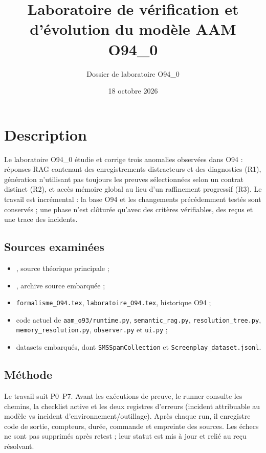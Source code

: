 \documentclass[11pt,a4paper]{article}
\title{Laboratoire de vérification et d'évolution du modèle AAM O94\_0}
\author{Dossier de laboratoire O94\_0}
\date{18 octobre 2026}
\begin{document}
\maketitle
\tableofcontents
\newpage

\section{Description}
Le laboratoire O94\_0 étudie et corrige trois anomalies observées dans O94 : réponses RAG contenant des enregistrements distracteurs et des diagnostics (R1), génération n'utilisant pas toujours les preuves sélectionnées selon un contrat distinct (R2), et accès mémoire global au lieu d'un raffinement progressif (R3). Le travail est incrémental : la base O94 et les changements précédemment testés sont conservés ; une phase n'est clôturée qu'avec des critères vérifiables, des reçus et une trace des incidents.

\subsection{Sources examinées}
\begin{itemize}
\item {}, source théorique principale ;
\item {}, archive source embarquée ;
\item \texttt{formalisme\_O94.tex}, \texttt{laboratoire\_O94.tex}, historique O94 ;
\item code actuel de \texttt{aam\_o93/runtime.py}, \texttt{semantic\_rag.py}, \texttt{resolution\_tree.py}, \texttt{memory\_resolution.py}, \texttt{observer.py} et \texttt{ui.py} ;
\item datasets embarqués, dont \texttt{SMSSpamCollection} et \texttt{Screenplay\_dataset.jsonl}.
\end{itemize}

\subsection{Méthode}
Le travail suit P0–P7. Avant les exécutions de preuve, le runner consulte les chemins, la checklist active et les deux registres d'erreurs (incident attribuable au modèle vs incident d'environnement/outillage). Après chaque run, il enregistre code de sortie, compteurs, durée, commande et empreinte des sources. Les échecs ne sont pas supprimés après retest ; leur statut est mis à jour et relié au reçu résolvant.
\end{document}
